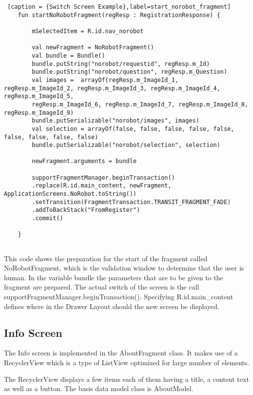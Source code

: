 \begin{lstlisting} [caption = {Switch Screen Example},label=start_norobot_fragment]
	fun startNoRobotFragment(regResp : RegistrationResponse) {
		
		mSelectedItem = R.id.nav_norobot  
		
		val newFragment = NoRobotFragment()
		val bundle = Bundle()
		bundle.putString("norobot/requestid", regResp.m_Id)
		bundle.putString("norobot/question", regResp.m_Question)
		val images =  arrayOf(regResp.m_ImageId_1, regResp.m_ImageId_2, regResp.m_ImageId_3, regResp.m_ImageId_4, regResp.m_ImageId_5,
		regResp.m_ImageId_6, regResp.m_ImageId_7, regResp.m_ImageId_8, regResp.m_ImageId_9)
		bundle.putSerializable("norobot/images", images)
		val selection = arrayOf(false, false, false, false, false, false, false, false, false)
		bundle.putSerializable("norobot/selection", selection)
		
		newFragment.arguments = bundle
		
		supportFragmentManager.beginTransaction()
		.replace(R.id.main_content, newFragment, ApplicationScreens.NoRobot.toString())
		.setTransition(FragmentTransaction.TRANSIT_FRAGMENT_FADE)
		.addToBackStack("FromRegister")
		.commit()
		
	}
	
\end{lstlisting}

This code shows the preparation for the start of the fragment called NoRobotFragment, which is the validation window to determine that the user is human. In the variable bundle the parameters that are to be given to the fragment are prepared. The actual switch of the screen is the call supportFragmentManager.beginTransaction(). Specifying R.id.main\_content defines where in the Drawer Layout should the new screen be displayed. 

\subsection {Info Screen} 

The Info screen is implemented in the AboutFragment class. It makes use of a RecyclerView which is a type of ListView optimized for large number of elements.

The RecyclerView displays a few items each of them having a title, a content text as well as a button. The basis data model class is AboutModel.


